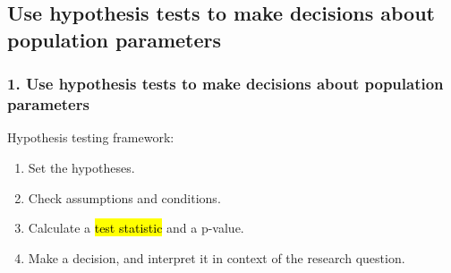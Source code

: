 \documentclass[slidestop,compress,mathserif,12pt,t,professionalfonts,xcolor=table]{beamer}
\begin{document}

\subsection{Use hypothesis tests to make decisions about population parameters}
\label{mi1}


\begin{frame}
\frametitle{1. Use hypothesis tests to make decisions about population parameters}

Hypothesis testing framework:

\begin{enumerate}

\item Set the hypotheses.

\item Check assumptions and conditions.

\item Calculate a \hl{test statistic} and a p-value.

\item Make a decision, and interpret it in context of the research question.

\end{enumerate}

\end{frame}

\end{document}
